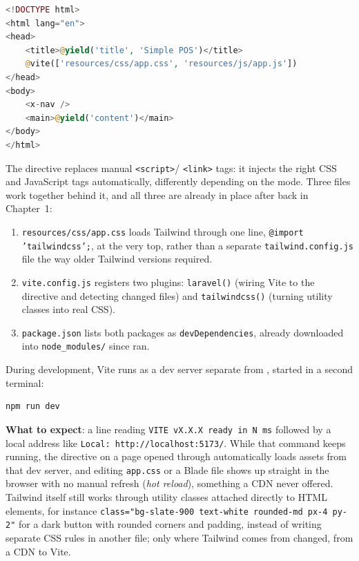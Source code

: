 \begin{lstlisting}[language=php, title=\lstfile{resources/views/layouts/app.blade.php}]
<!DOCTYPE html>
<html lang="en">
<head>
    <title>@yield('title', 'Simple POS')</title>
    @vite(['resources/css/app.css', 'resources/js/app.js'])
</head>
<body>
    <x-nav />
    <main>@yield('content')</main>
</body>
</html>
\end{lstlisting}

The  directive replaces manual \texttt{<script>}/
\texttt{<link>} tags: it injects the right CSS and JavaScript tags
automatically, differently depending on the mode. Three files work
together behind it, and all three are already in place after  back in Chapter~1:

\begin{enumerate}
  \item \texttt{resources/css/app.css} loads Tailwind through one line,
    \texttt{@import 'tailwindcss';}, at the very top, rather than a
    separate \texttt{tailwind.config.js} file the way older Tailwind
    versions required.
  \item \texttt{vite.config.js} registers two plugins: \texttt{laravel()}
    (wiring Vite to the  directive and detecting changed
    files) and \texttt{tailwindcss()} (turning utility classes into real
    CSS).
  \item \texttt{package.json} lists both packages as
    \texttt{devDependencies}, already downloaded into
    \texttt{node\_modules/} since  ran.
\end{enumerate}

During development, Vite runs as a dev server separate from , started in a second terminal:

\begin{lstlisting}[language=bash]
npm run dev
\end{lstlisting}

\textbf{What to expect}: a line reading \texttt{VITE vX.X.X ready in N ms}
followed by a local address like \texttt{Local: http://localhost:5173/}.
While that command keeps running, the  directive on a page
opened through  automatically loads assets from
that dev server, and editing \texttt{app.css} or a Blade file shows up
straight in the browser with no manual refresh (\textit{hot reload}),
something a CDN never offered. Tailwind itself still works through
utility classes attached directly to HTML elements, for instance
\texttt{class="bg-slate-900 text-white rounded-md px-4 py-2"} for a dark
button with rounded corners and padding, instead of writing separate CSS
rules in another file; only where Tailwind comes from changed, from a CDN
to Vite.

